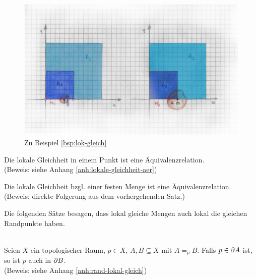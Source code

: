     \begin{figure}[ht]
        \centering
        \includegraphics[width=\textwidth]{bearbeitet-22-04-25/lok-gleich.png}
        \caption{Zu Beispiel \ref{bsp:lok-gleich}}
        \label{fig:lok-gleich}
    \end{figure}

        
%     
    
    \begin{satz}\label{satz:lokale-gleichheit-aer}
        Die lokale Gleichheit in einem Punkt ist eine Äquivalenzrelation.\\
        (Beweis: siehe Anhang \ref{anh:lokale-gleichheit-aer})
    \end{satz}
    
    \begin{kor}\label{kor:lokale-gleichheit-aer}
     Die lokale Gleichheit bzgl. einer festen Menge ist eine Äquivalenzrelation.\\
     (Beweis: direkte Folgerung aus dem vorhergehenden Satz.)
    \end{kor}
    
    Die folgenden Sätze besagen, dass lokal gleiche Mengen auch lokal die gleichen Randpunkte haben.
    \begin{satz}\label{satz:rand-lokal-gleich}\ \\
        Seien $X$ ein topologischer Raum, $p \in X$, $A,B \subseteq X$ mit $A =_p B$. Falls $p \in \partial A$ ist, so ist $p$ auch in $\partial B$.\\
        (Beweis: siehe Anhang \ref{anh:rand-lokal-gleich})
    \end{satz}
    
